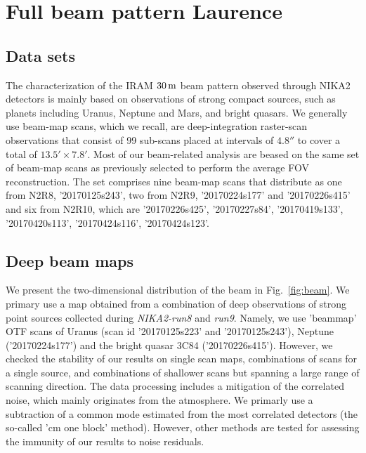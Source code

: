 \section{Full beam pattern {\color{blue} Laurence}}
\label{se:fullbeam}

\subsection{Data sets}
\label{se:beammap_set}

The characterization of the IRAM $30\,\rm{m}$ beam pattern observed through NIKA2 detectors is mainly based on observations of strong compact sources, such as planets including Uranus, Neptune and Mars, and bright quasars. We generally use beam-map scans, which we recall, are deep-integration raster-scan observations that consist of 99 sub-scans placed at intervals of $4.8''$ to cover a total of $13.5' \times 7.8'$. Most of our beam-related analysis are beased on the same set of beam-map scans as previously selected to perform the average FOV reconstruction. The set comprises nine beam-map scans that distribute as one from N2R8, '20170125s243', two from N2R9, '20170224s177' and '20170226s415' and six from N2R10, which are '20170226s425', '20170227s84', '20170419s133', '20170420s113', '20170424s116', '20170424s123'. 


\subsection{Deep beam maps}
\label{se:beammaps}
We present the two-dimensional distribution of the beam in Fig.~\ref{fig:beam}. We primary use a map obtained from a combination of deep observations of strong point sources collected during \emph{NIKA2-run8} and \emph{run9}. Namely, we use 'beammap' OTF scans of Uranus (scan id '20170125s223' and '20170125s243'),  Neptune ('20170224s177') and the bright quasar 3C84 ('20170226s415'). However, we checked the stability of our results on single scan maps, combinations of scans for a single source, and combinations of shallower scans but spanning a large range of scanning direction. The data processing includes a mitigation of the correlated noise, which mainly originates from the atmosphere.  We primarly use a subtraction of a common mode estimated from the most correlated detectors (the so-called 'cm one block' method). However, other methods are tested for assessing the immunity of our results to noise residuals.

